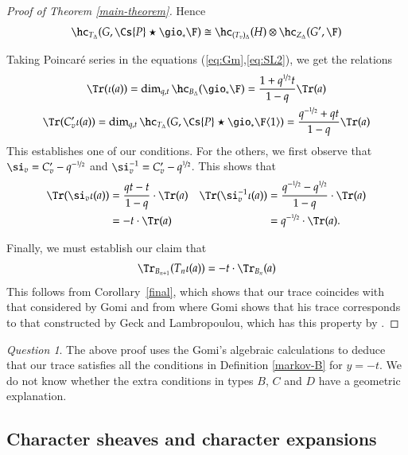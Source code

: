 \documentclass[12pt]{amsart}
\theoremstyle{remark}
\newtheorem{question}{Question}
\begin{document}
\begin{proof}[Proof of Theorem \ref{main-theorem}]
Hence
\begin{equation} \label{eq:SL2}
\hc_{T_{\Delta}}(G, \Cs{P}\star \gio_* \F)
\cong \hc_{(T_v)_\Delta}(H)  \otimes \hc_{Z_{\Delta}}(G', \F)
\end{equation}

Taking Poincar\'e series in the equations (\ref{eq:Gm},\ref{eq:SL2}), we get the relations
\begin{gather*}
    \Tr(\iota(a))=
\dim_{q,t} \hc_{B_{\Delta}}(\gio_* \F)
=\frac{1 + q^{\nicefrac 12}t}{1-q}\Tr(a)\\
\Tr(C^{\prime}_v\iota(a)) =
\dim_{q,t}\hc_{T_{\Delta}}(G, \Cs{P}\star \gio_* \F \langle 1 \rangle)
=\frac{q^{-\nicefrac{1}{2}} + qt}{1-q}\Tr(a)
\end{gather*}
This establishes one of our conditions.  For the others, we first
observe that $\si_v=C^{\prime}_v-q^{- \nicefrac{1}{2}}$ and $\si_v^{-1}=C^{\prime}_v-q^{\nicefrac{1}{2}}$.  This shows that
\begin{align*}
  \Tr(\si_v\iota(a))&=\frac{qt -t}{1-q}\cdot \Tr(a)&\Tr(\si_v^{-1}\iota(a))& = \frac{ q^{-\nicefrac 12} -q^{ \nicefrac 12 } }{1 - q}
  \cdot \Tr(a)\\
  &=-t\cdot \Tr(a)&&=q^{- \nicefrac 12}\cdot \Tr(a).
\end{align*}

Finally, we must establish our claim that
\begin{equation*}
  \Tr_{B_{n+1}}(T_{n}\iota(a)) = -t \cdot \Tr_{B_n}(a)
\end{equation*}
This follows from Corollary~\ref{final}, which shows that our trace
coincides with that considered by Gomi and from \cite[\S 4.4 \& 
4.5]{Gomi} where Gomi shows that his trace corresponds to that
constructed by Geck and Lambropoulou, which has this property by \cite[Proposition 4.5]{GL}.
\end{proof}

\begin{question} The above proof uses the Gomi's algebraic calculations to deduce that our trace satisfies all the conditions in Definition \ref{markov-B} for $y = -t$. We do not know whether the extra conditions in types $B$, $C$ and $D$ have a geometric explanation.
\end{question}

\subsection{Character sheaves and character expansions}
\end{document}
